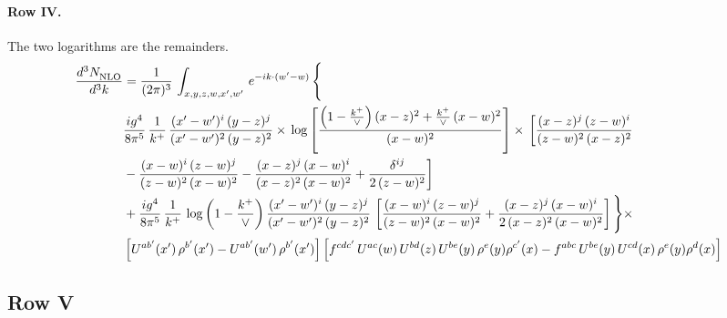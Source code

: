 \documentclass[10pt]{article}
\numberwithin{equation}{section}
\begin{document}
\paragraph{Row IV.}
The two logarithms are the remainders.
\begin{align}
    \frac{d^{3}N_{\rm NLO}^{\rm}}{d^{3}k}  & =   \frac{1}{(2\pi)^{3}}\,
    \int_{x,y,z,w,x',w'}\,e^{-ik\cdot (w^\prime-w)}\,\Bigg\{\notag \\
& \frac{ig^{4}}{8\pi^{5}}\,\frac{1}{k^{+}}\,\frac{(x'-w')^{i}\,(y-z)^{j}}{(x'-w')^{2}\,(y-z)^{2}}\times\,\log{\left[\frac{\left(1-\frac{k^{+}}{\vee}\right)(x-z)^{2}+\frac{k^{+}}{\vee}\,(x-w)^{2}}{(x-w)^{2}}\right]}\times\, \bigg[\frac{(x-z)^{j}\,(z-w)^{i}}{(z-w)^{2}\,(x-z)^{2}}\notag \\ & -\frac{(x-w)^{i}\,(z-w)^{j}}{(z-w)^{2}\,(x-w)^{2}}-\frac{(x-z)^{j}\,(x-w)^{i}}{(x-z)^{2}\,(x-w)^{2}}+\frac{\delta^{ij}}{2\,(z-w)^{2}}\bigg] \notag \\
& + \frac{ig^{4}}{8\pi^{5}}\,\frac{1}{k^{+}}\,\log{\left(1-\frac{k^{+}}{\vee}\right)}\,\frac{(x'-w')^{i}\,(y-z)^{j}}{(x'-w')^{2}\,(y-z)^{2}}\,\left[\frac{(x-w)^{i}\,(z-w)^{j}}{(z-w)^{2}\,(x-w)^{2}}+\frac{(x-z)^{j}\,(x-w)^{i}}{2\, (x-z)^{2}\,(x-w)^{2}}\right]\Bigg\}\times\notag \\ &  \left[U^{ab'}(x')\,\rho^{b'}(x')-U^{ab'}(w')\,\rho^{b'}(x')\right] \left[f^{cdc'}\,U^{ac}(w)\,U^{bd}(z)\,U^{be}(y)\,\rho^{e}(y)\rho^{c'}(x)-f^{abc}\,U^{be}(y)\,U^{cd}(x)\,\rho^{e}(y)\rho^{d}(x)\right] \label{eq:R:G1IV}
\end{align}

\subsection{Row V}
\end{document}
